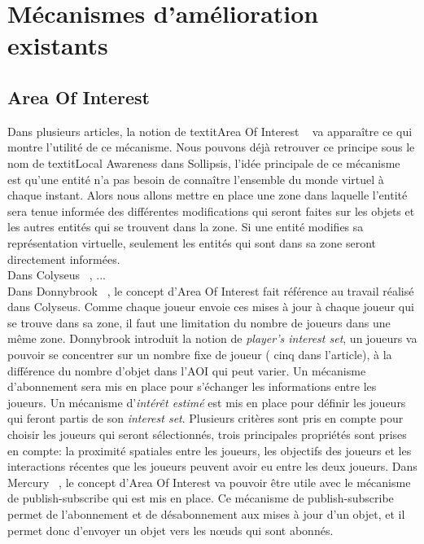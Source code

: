 \section{Mécanismes d'amélioration existants}
	\subsection{Area Of Interest}
	Dans plusieurs articles, la notion de textit{Area Of Interest} ~\cite{1403002,1267692,1015507} va apparaître ce qui montre l'utilité de ce mécanisme. Nous pouvons déjà retrouver ce principe sous le nom de textit{Local Awareness} dans Sollipsis, l'idée principale de ce mécanisme est qu'une entité n'a pas besoin de connaître l'ensemble du monde virtuel à chaque instant. Alors nous allons mettre en place une zone dans laquelle l'entité sera tenue informée des différentes modifications qui seront faites sur les objets et les autres entités qui se trouvent dans la zone. Si une entité modifies sa représentation virtuelle, seulement les entités qui sont dans sa zone seront directement informées.\\

	Dans Colyseus ~\cite{1267692}, ... \\
	Dans Donnybrook ~\cite{1403002}, le concept d'Area Of Interest fait référence au travail réalisé dans Colyseus. Comme chaque joueur envoie ces mises à jour à chaque joueur qui se trouve dans sa zone, il faut une limitation du nombre de joueurs dans une même zone. Donnybrook introduit la notion de \textit{player's interest set}, un joueurs va pouvoir se concentrer sur un nombre fixe de joueur ( cinq dans l'article), à la différence du nombre d'objet dans l'AOI qui peut varier. Un mécanisme d'abonnement sera mis en place pour s'échanger les informations entre les joueurs. Un mécanisme d'\textit{intérêt estimé} est mis en place pour définir les joueurs qui feront partis de son \textit{interest set}. Plusieurs critères sont pris en compte pour choisir les joueurs qui seront sélectionnés, trois principales propriétés sont prises en compte: la proximité spatiales entre les joueurs, les objectifs des joueurs et les interactions récentes que les joueurs peuvent avoir eu entre les deux joueurs.
	Dans Mercury ~\cite{1015507}, le concept d'Area Of Interest va pouvoir être utile avec le mécanisme de publish-subscribe qui est mis en place. Ce mécanisme de publish-subscribe permet de l'abonnement et de désabonnement aux mises à jour d'un objet, et il permet donc d'envoyer un objet vers les nœuds qui sont abonnés.\\
	
